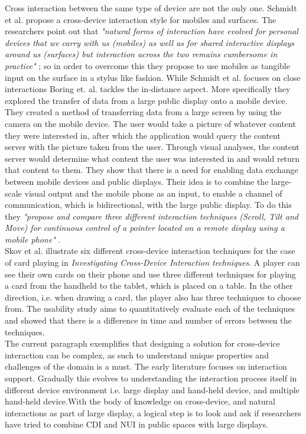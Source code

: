 Cross interaction between the same type of device are not the only one. Schmidt et al. propose a cross-device interaction style for mobiles and surfaces. The researchers point out that \emph{"natural forms of interaction have evolved for personal devices that we carry with us (mobiles) as well as for shared interactive displays around us (surfaces) but interaction across the two remains cumbersome in practice"} \cite{Schmidt:2012}; so in order to overcome this they propose to use mobiles as tangible input on the surface in a stylus like fashion. While Schmidt et al. focuses on close interactions Boring et. al. tackles the in-distance aspect. More specifically they explored
the transfer of data from a large public display onto a mobile
device. They created a method of transferring data from a large
screen by using the camera on the mobile device. The user
would take a picture of whatever content they were interested
in, after which the application would query the content server
with the picture taken from the user. Through visual analyses,
the content server would determine what content the user was
interested in and would return that content to them. They show
that there is a need for enabling data exchange between mobile
devices and public displays. Their idea is to combine the large-scale visual output and the mobile phone as an input, to enable a channel of communication, which is bidirectional, with the large public display. To do this they \emph{"propose and compare three different interaction techniques (Scroll, Tilt and Move) for continuous control of a pointer located on a remote display using a mobile phone"} \cite{Boring:2009}.\\

Skov et al. \cite{Skov:2015} illustrate six different cross-device interaction techniques for the case of card playing in \emph{Investigating Cross-Device Interaction techniques}.
A player can see their own cards on their phone and use three different techniques for playing a card from the handheld to the tablet, which is placed on a table.
In the other direction, i.e. when drawing a card, the player also has three techniques to choose from.
The usability study aims to quantitatively evaluate each of the techniques and showed that there is a difference in time and number of errors between the techniques. \\

The current paragraph exemplifies that designing a solution for cross-device interaction can be complex, as such to understand  unique properties and challenges of the domain is a must. The early literature focuses on interaction support. Gradually this evolves to understanding the interaction process itself in different device environment i.e. large display and hand-held device, and multiple hand-held device.With the body of knowledge on cross-device, and natural interactions as part of large display, a logical step is to look and ask if researchers have tried to combine CDI and NUI in public spaces with large displays.
